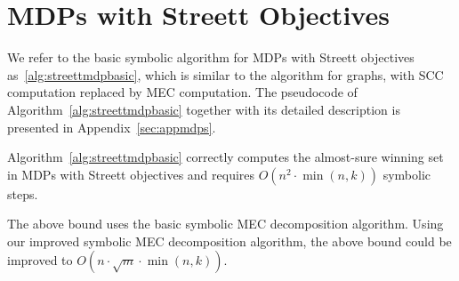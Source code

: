 \section{MDPs with Streett Objectives}\label{sec:mdps}

\smallskip{}
We refer to the basic symbolic algorithm for MDPs with Streett objectives
as~\ref{alg:streettmdpbasic}, which is similar to the algorithm for graphs,
with SCC computation replaced by MEC computation.
The pseudocode of Algorithm~\ref{alg:streettmdpbasic} together with its
detailed description is presented in Appendix~\ref{sec:appmdps}. 

\begin{prp}\label{prp:basicmdps}
Algorithm~\ref{alg:streettmdpbasic} correctly computes the almost-sure winning set
in MDPs with Streett objectives and requires $O(n^2 \cdot \min(n,k))$ symbolic steps.
\end{prp}

\begin{rmk}
The above bound uses the basic symbolic MEC decomposition algorithm. 
Using our improved symbolic MEC decomposition algorithm, the above bound
could be improved to 
$O(n \cdot \sqrt{m} \cdot \min(n,k))$.
\end{rmk}

